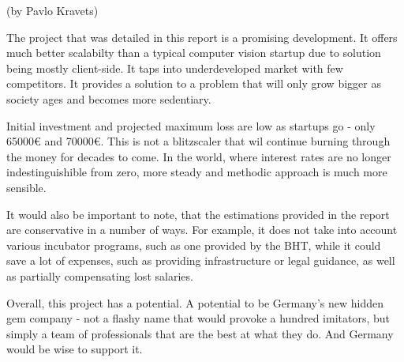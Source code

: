 (by Pavlo Kravets)

\p
The project that was detailed in this report is a promising development. It offers much better scalabilty than a typical computer vision startup due to solution being mostly client-side. It taps into underdeveloped market with few competitors. It provides a solution to a problem that will only grow bigger as society ages and becomes more sedentiary.

\p
Initial investment and projected maximum loss are low as startups go - only 65000€ and 70000€. This is not a blitzscaler that wil continue burning through the money for decades to come. In the world, where interest rates are no longer indestinguishible from zero, more steady and methodic approach is much more sensible.

\p
It would also be important to note, that the estimations provided in the report are conservative in a number of ways. For example, it does not take into account various incubator programs, such as one provided by the BHT, while it could save a lot of expenses, such as providing infrastructure or legal guidance, as well as partially compensating lost salaries. 

\p
Overall, this project has a potential. A potential to be Germany's new hidden gem company - not a flashy name that would provoke a hundred imitators, but simply a team of professionals that are the best at what they do. And Germany would be wise to support it.